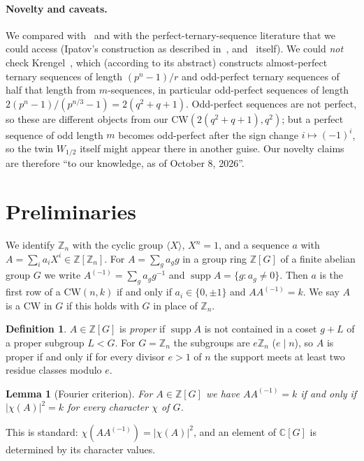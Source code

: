 \documentclass[11pt]{article}
\numberwithin{equation}{section}
\newtheorem{lemma}[theorem]{Lemma}
\theoremstyle{definition}
\newtheorem{definition}[theorem]{Definition}
\theoremstyle{remark}
\newcommand{\Z}{\mathbb Z}
\newcommand{\CW}{\mathrm{CW}}
\DeclareMathOperator{\supp}{supp}
\begin{document}
\paragraph{Novelty and caveats.} We compared with~\cite{GordonRepo,G26,AGZ,Tan26,LS11,SS13} and
with the perfect-ternary-sequence literature that we could access (Ipatov's construction as
described in~\cite{HJ83}, and~\cite{HJ83} itself). We could \emph{not} check
Krengel~\cite{Kr04}, which (according to its abstract) constructs almost-perfect ternary sequences
of length $(p^n-1)/r$ and odd-perfect ternary sequences of half that length from $m$-sequences, in
particular odd-perfect sequences of length $2(p^n-1)/(p^{n/3}-1)=2(q^2+q+1)$. Odd-perfect sequences
are not perfect, so these are different objects from our $\CW(2(q^2+q+1),q^2)$; but a perfect
sequence of odd length $m$ becomes odd-perfect after the sign change $i\mapsto(-1)^i$, so the twin
$W_{1/2}$ itself might appear there in another guise. Our novelty claims are therefore ``to our
knowledge, as of October 8, 2026''.

\section{Preliminaries}\label{sec:prelim}

We identify $\Z_n$ with the cyclic group $\langle X\rangle$, $X^n=1$, and a sequence $a$ with
$A=\sum_i a_iX^i\in\Z[\Z_n]$. For $A=\sum_g a_g g$ in a group ring $\Z[G]$ of a finite abelian
group $G$ we write $A^{(-1)}=\sum_g a_g g^{-1}$ and $\supp A=\{g:a_g\ne0\}$.
Then $a$ is the first row of a $\CW(n,k)$ if and only if $a_i\in\{0,\pm1\}$ and
$AA^{(-1)}=k$. We say $A$ is a $\CW$ in $G$ if this holds with $G$ in place of $\Z_n$.

\begin{definition}
$A\in\Z[G]$ is \emph{proper} if $\supp A$ is not contained in a coset $g+L$ of a proper
subgroup $L<G$. For $G=\Z_n$ the subgroups are $e\Z_n$ ($e\mid n$), so $A$ is proper if and
only if for every divisor $e>1$ of $n$ the support meets at least two residue classes modulo $e$.
\end{definition}

\begin{lemma}[Fourier criterion]\label{lem:fourier}
For $A\in\Z[G]$ we have $AA^{(-1)}=k$ if and only if $|\chi(A)|^2=k$ for every character $\chi$
of $G$.
\end{lemma}
This is standard: $\chi(AA^{(-1)})=|\chi(A)|^2$, and an element of $\mathbb C[G]$ is determined
by its character values.
\end{document}
